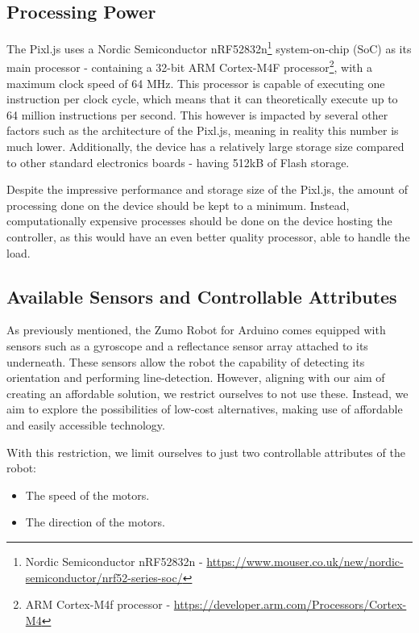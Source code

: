 \documentclass{l4proj}
\begin{document}
\subsection{Processing Power}\label{sec:robot-processing-power}
The Pixl.js uses a Nordic Semiconductor nRF52832n\footnote{Nordic Semiconductor nRF52832n - \url{https://www.mouser.co.uk/new/nordic-semiconductor/nrf52-series-soc/}} system-on-chip (SoC) as its main processor - containing a 32-bit ARM Cortex-M4F processor\footnote{ARM Cortex-M4f processor - \url{https://developer.arm.com/Processors/Cortex-M4}}, with a maximum clock speed of 64 MHz. This processor is capable of executing one instruction per clock cycle, which means that it can theoretically execute up to 64 million instructions per second. This however is impacted by several other factors such as the architecture of the Pixl.js, meaning in reality this number is much lower. Additionally, the device has a relatively large storage size compared to other standard electronics boards - having 512kB of Flash storage.

Despite the impressive performance and storage size of the Pixl.js, the amount of processing done on the device should be kept to a minimum. Instead, computationally expensive processes should be done on the device hosting the controller, as this would have an even better quality processor, able to handle the load.

\subsection{Available Sensors and Controllable Attributes}\label{sec:controllable-attributes}
As previously mentioned, the Zumo Robot for Arduino comes equipped with sensors such as a gyroscope and a reflectance sensor array attached to its underneath. These sensors allow the robot the capability of detecting its orientation and performing line-detection. However, aligning with our aim of creating an affordable solution, we restrict ourselves to not use these. Instead, we aim to explore the possibilities of low-cost alternatives, making use of affordable and easily accessible technology.

With this restriction, we limit ourselves to just two controllable attributes of the robot:
 \begin{itemize}
     \item The speed of the motors.
     \item The direction of the motors.
 \end{itemize}
\end{document}
